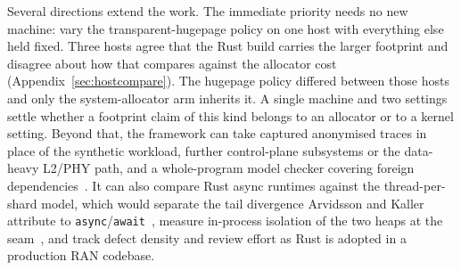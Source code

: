 \documentclass[english,oneside,a4paper,censored,csm,software-track-2020]{HYthesisML}
\begin{document}
Several directions extend the work. The immediate priority needs no new machine: vary the
transparent-hugepage policy on one host with everything else held fixed. Three hosts agree that
the Rust build carries the larger footprint and disagree about how that compares against the
allocator cost (Appendix~\ref{sec:hostcompare}). The hugepage policy differed between those hosts
and only the system-allocator arm inherits it. A single machine and two settings settle whether
a footprint claim of this kind belongs to an allocator or to a kernel setting. Beyond that, the
framework can take captured anonymised traces in place of the synthetic workload, further
control-plane subsystems or the data-heavy L2/PHY path, and a whole-program model checker
covering foreign dependencies~\cite{pearce2026rustmc}. It can also compare Rust async runtimes
against the thread-per-shard model, which would separate the tail divergence Arvidsson and Kaller
attribute to \texttt{async}/\texttt{await}~\cite{arvidsson2025async}, measure in-process isolation of
the two heaps at the seam~\cite{rivera2021galeed,kirth2022pkrusafe}, and track defect density
and review effort as Rust is adopted in a production RAN codebase.



\cleardoublepage %

\printbibliography
\end{document}
